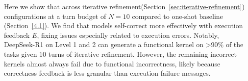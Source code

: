 Here we show that  across iterative refinement(Section~\ref{sec:iterative-refinement}) configurations at a turn budget of $N=10$ compared to one-shot baseline (Section~\ref{4.1}). We find that models self-correct more effectively with execution feedback $E$, fixing issues especially related to execution errors. Notably, DeepSeek-R1 on Level 1 and 2 can generate a functional kernel on \textgreater 90\% of the tasks given $10$ turns of iterative refinement. However, the remaining incorrect kernels almost always fail due to functional incorrectness, likely because correctness feedback is less granular than execution failure messages.

